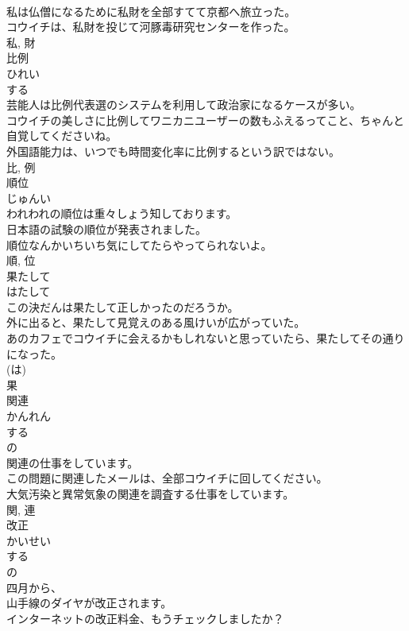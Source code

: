 \documentclass[8pt]{extreport}
\begin{document}
\begin{CJK}{UTF8}{min}
\\	私は仏僧になるために私財を全部すてて京都へ旅立った。	
\\	コウイチは、私財を投じて河豚毒研究センターを作った。	
\\	私, 財	
\\	比例	
\\	ひれい	
\\	する 
\\	芸能人は比例代表選のシステムを利用して政治家になるケースが多い。	
\\	コウイチの美しさに比例してワニカニユーザーの数もふえるってこと、ちゃんと自覚してくださいね。	
\\	外国語能力は、いつでも時間変化率に比例するという訳ではない。	
\\	比, 例	
\\	順位	
\\	じゅんい	
\\	われわれの順位は重々しょう知しております。	
\\	日本語の試験の順位が発表されました。	
\\	順位なんかいちいち気にしてたらやってられないよ。	
\\	順, 位	
\\	果たして	
\\	はたして	
\\	この決だんは果たして正しかったのだろうか。	
\\	外に出ると、果たして見覚えのある風けいが広がっていた。	
\\	あのカフェでコウイチに会えるかもしれないと思っていたら、果たしてその通りになった。	
\\	(は) 
\\	果	
\\	関連	
\\	かんれん	
\\	する 
\\	の 
\\	関連の仕事をしています。	
\\	この問題に関連したメールは、全部コウイチに回してください。	
\\	大気汚染と異常気象の関連を調査する仕事をしています。	
\\	関, 連	
\\	改正	
\\	かいせい	
\\	する 
\\	の 
\\	四月から、
\\	山手線のダイヤが改正されます。	
\\	インターネットの改正料金、もうチェックしましたか？	

\end{CJK}
\end{document}

